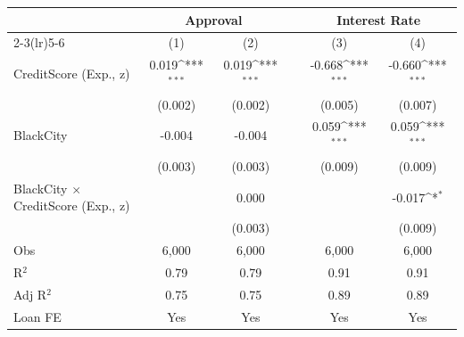 {\def\sym#1{\ifmmode^{#1}\else\(^{#1}\)\fi}
\begin{tabular}{l*{5}{c}} \toprule
                &\multicolumn{2}{c}{Approval}         &         &\multicolumn{2}{c}{Interest Rate}    \\\cmidrule(lr){2-3}\cmidrule(lr){5-6}
                &\multicolumn{1}{c}{(1)}         &\multicolumn{1}{c}{(2)}         &         &\multicolumn{1}{c}{(3)}         &\multicolumn{1}{c}{(4)}         \\
\midrule
CreditScore (Exp., z)&    0.019\sym{***}&    0.019\sym{***}&         &   -0.668\sym{***}&   -0.660\sym{***}\\
                &  (0.002)         &  (0.002)         &         &  (0.005)         &  (0.007)         \\
BlackCity       &   -0.004         &   -0.004         &         &    0.059\sym{***}&    0.059\sym{***}\\
                &  (0.003)         &  (0.003)         &         &  (0.009)         &  (0.009)         \\
BlackCity $\times$ CreditScore (Exp., z)&                  &    0.000         &         &                  &   -0.017\sym{*}  \\
                &                  &  (0.003)         &         &                  &  (0.009)         \\
\midrule
Obs             &    6,000         &    6,000         &         &    6,000         &    6,000         \\
R$^2$           &     0.79         &     0.79         &         &     0.91         &     0.91         \\
Adj R$^2$       &     0.75         &     0.75         &         &     0.89         &     0.89         \\
Loan FE         &      Yes         &      Yes         &         &      Yes         &      Yes         \\
\bottomrule
\end{tabular}
}
